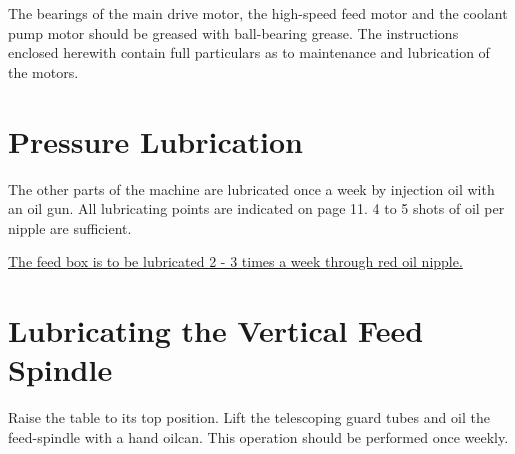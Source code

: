 The bearings of the main drive motor, the high-speed feed motor
and the coolant pump motor should be greased with ball-bearing
grease. The instructions enclosed herewith contain full particulars
as to maintenance and lubrication of the motors.

\section*{Pressure Lubrication}

The other parts of the machine are lubricated once a week by
injection oil with an oil gun. All lubricating points are
indicated on page 11. 4 to 5 shots of oil per nipple are
sufficient.

\underline{The feed box is to be lubricated 2 - 3 times a week through red oil nipple.}

\section*{Lubricating the Vertical Feed Spindle}

Raise the table to its top position. Lift the telescoping guard
tubes and oil the feed-spindle with a hand oilcan. This operation
should be performed once weekly.
